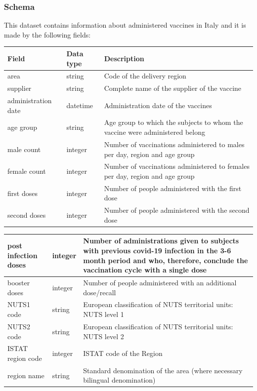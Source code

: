\documentclass{article}
\begin{document}
\subsubsection{Schema}
\label{subsec:vaccination schema}
This dataset contains information about administered vaccines in Italy and it is made by the following fields:
\hfill\break
\begin{center}
\begin{tabular}{ |m{4cm}|m{2cm}|m{4.5cm}|}
  \hline
  \bfseries{Field} & \bfseries{Data type} & \bfseries{Description} \\
  \hline\hline
  area & string & Code of the delivery region\\
    \hline
      supplier & string & Complete name of the supplier of the vaccine\\
    \hline
          administration date & datetime & Administration date of the vaccines\\
              \hline
          age group & string & Age group to which the subjects to whom the vaccine were administered belong\\
                        \hline
          male count & integer & Number of vaccinations administered to males per day, region and age group\\
                        \hline
          female count & integer & Number of vaccinations administered to females per day, region and age group\\
    \hline
  first doses & integer & Number of people administered with the first dose\\
    \hline
  second doses & integer & Number of people administered with the second dose\\
    \hline

\end{tabular}
\end{center}

\newpage
\begin{center}
\begin{tabular}{ |m{4cm}|m{2cm}|m{4.5cm}|}
\hline
  post infection doses & integer & Number of administrations given to subjects with previous covid-19 infection in the 3-6 month period and who, therefore, conclude the vaccination cycle with a single dose\\
    \hline
  booster doses & integer & Number of people administered with an additional dose/recall\\
    \hline
  NUTS1 code & string & European classification of NUTS territorial units: NUTS level 1\\
    \hline
  NUTS2 code & string & European classification of NUTS territorial units: NUTS level 2\\
    \hline
  ISTAT region code & integer & ISTAT code of the Region\\
    \hline
  region name & string & Standard denomination of the area (where necessary bilingual denomination)\\
  \hline
  \end{tabular}
\end{center}
\hfill\break
\hfill\break
\end{document}
